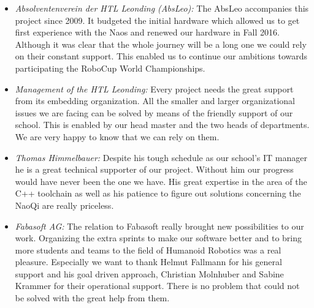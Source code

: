 \documentclass[11pt]{article}
\begin{document}
\begin{itemize}
	\item \emph{Absolventenverein der HTL Leonding (AbsLeo):} The AbsLeo accompanies this project since 2009. It budgeted the initial hardware which allowed us to get first experience with the Naos and renewed our hardware in Fall 2016. Although it was clear that the whole journey will be a long one we could rely on their constant support. This enabled us to continue our ambitions towards participating the RoboCup World Championships.
	
	\item \emph{Management of the HTL Leonding:} Every project needs the great support from its embedding organization. All the smaller and larger organizational issues we are facing can be solved by means of the friendly support of our school. This is enabled by our head master and the two heads of departments. We are very happy to know that we can rely on them.
	
	\item \emph{Thomas Himmelbauer:} Despite his tough schedule as our school's IT manager he is a great technical supporter of our project. Without him our progress would have never been the one we have. His great expertise in the area of the C++ toolchain as well as his patience to figure out solutions concerning the NaoQi are really priceless.
	
	\item \emph{Fabasoft AG:} The relation to Fabasoft really brought new possibilities to our work. Organizing the extra sprints to make our software better and to bring more students and teams to the field of Humanoid Robotics was a real pleasure. Especially we want to thank Helmut Fallmann for his general support and his goal driven approach, Christian Molnhuber and Sabine Krammer for their operational support. There is no problem that could not be solved with the great help from them.
\end{itemize}
\end{document}
